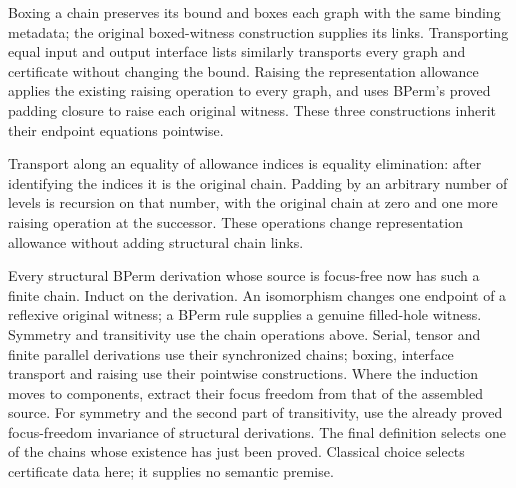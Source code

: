 
Boxing a chain preserves its bound and boxes each graph with the same binding
metadata; the original boxed-witness construction supplies its links.
Transporting equal input and output interface lists similarly transports
every graph and certificate without changing the bound. Raising the
representation allowance applies the existing raising operation to every
graph, and uses BPerm's proved padding closure to raise each original witness.
These three constructions inherit their endpoint equations pointwise.


Transport along an equality of allowance indices is equality elimination:
after identifying the indices it is the original chain. Padding by an
arbitrary number of levels is recursion on that number, with the original
chain at zero and one more raising operation at the successor. These operations
change representation allowance without adding structural chain links.


Every structural BPerm derivation whose source is focus-free now has such a
finite chain. Induct on the derivation. An isomorphism changes one endpoint
of a reflexive original witness; a BPerm rule supplies a genuine filled-hole
witness. Symmetry and transitivity use the chain operations above. Serial,
tensor and finite parallel derivations use their synchronized chains; boxing,
interface transport and raising use their pointwise constructions. Where the
induction moves to components, extract their focus freedom from that of the
assembled source. For symmetry and the second part of transitivity, use the
already proved focus-freedom invariance of structural derivations. The final
definition selects one of the chains whose existence has just been proved.
Classical choice selects certificate data here; it supplies no semantic premise.


